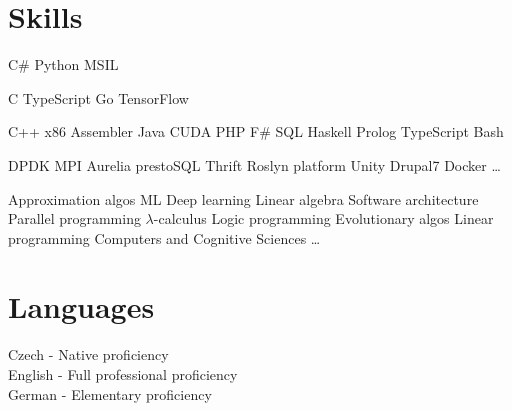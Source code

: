 \documentclass[a4paper]{deedy-resume} %
\begin{document}
\begin{minipage}[t]{0.33\textwidth}
\sectionspace %


\section{Skills}


C\# \textbullet{}  Python \textbullet{} MSIL \\ 
\halfsectionspace %

C \textbullet{} TypeScript \textbullet{} Go \textbullet{} TensorFlow \\
\halfsectionspace %

C++ \textbullet{} x86 Assembler \textbullet{} Java \textbullet{} CUDA \textbullet{} PHP \textbullet{} F\# \textbullet SQL \textbullet{} Haskell \textbullet{} Prolog \textbullet TypeScript \textbullet{} Bash \\

\sectionspace %

DPDK \textbullet{} MPI \textbullet{} Aurelia \textbullet{} prestoSQL \textbullet{} Thrift \textbullet{} Roslyn platform \textbullet{} Unity \textbullet{} Drupal7 \textbullet{} Docker \textbullet{} \ldots \\

\sectionspace %


Approximation algos \textbullet{} ML \textbullet{} Deep learning \textbullet{} Linear algebra \textbullet{} Software architecture \textbullet{} Parallel programming \textbullet{} $\lambda$-calculus \textbullet{} Logic programming \textbullet{} Evolutionary algos \textbullet{} Linear programming \textbullet{} Computers and Cognitive Sciences \textbullet{} \ldots 

\sectionspace %

\section{Languages}

Czech - Native proficiency \\
English - Full professional proficiency \\
German - Elementary proficiency


\end{minipage}
\end{document}
